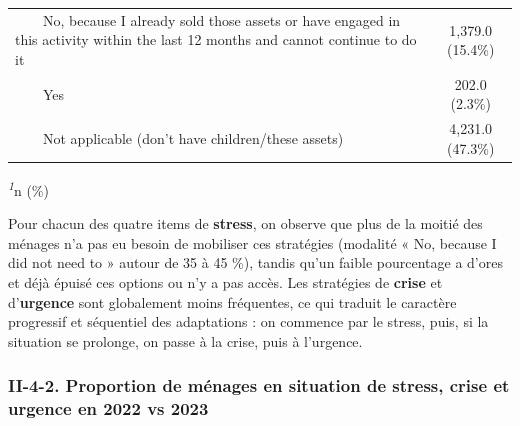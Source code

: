 \documentclass[
]{article}
\begin{document}
\begin{table}[!t]
\begin{tabular*}{\linewidth}{@{\extracolsep{\fill}}lc}
    No, because I already sold those assets or have engaged in this activity within the last 12 months and cannot continue to do it & 1,379.0 (15.4\%) \\ 
    Yes & 202.0 (2.3\%) \\ 
    Not applicable (don't have children/these assets) & 4,231.0 (47.3\%) \\ 
\bottomrule
\end{tabular*}
\begin{minipage}{\linewidth}
\textsuperscript{\textit{1}}n (\%)\\
\end{minipage}
\end{table}

Pour chacun des quatre items de \textbf{stress}, on observe que plus de
la moitié des ménages n'a pas eu besoin de mobiliser ces stratégies
(modalité « No, because I did not need to » autour de 35 à 45 \%),
tandis qu'un faible pourcentage a d'ores et déjà épuisé ces options ou
n'y a pas accès. Les stratégies de \textbf{crise} et d'\textbf{urgence}
sont globalement moins fréquentes, ce qui traduit le caractère
progressif et séquentiel des adaptations : on commence par le stress,
puis, si la situation se prolonge, on passe à la crise, puis à
l'urgence.

\hypertarget{ii-4-2.-proportion-de-muxe9nages-en-situation-de-stress-crise-et-urgence-en-2022-vs-2023}{%
\subsubsection{II-4-2. Proportion de ménages en situation de stress,
crise et urgence en 2022 vs
2023}\label{ii-4-2.-proportion-de-muxe9nages-en-situation-de-stress-crise-et-urgence-en-2022-vs-2023}}
\end{document}
